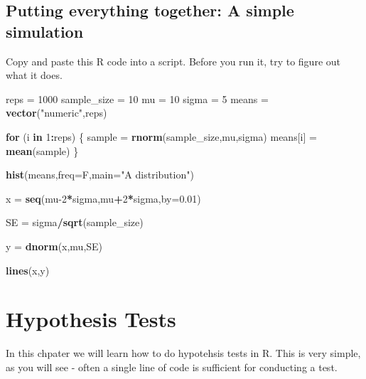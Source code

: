 \documentclass[]{article}
\newenvironment{Shaded}{\begin{snugshade}}{\end{snugshade}}
\newcommand{\ControlFlowTok}[1]{\textcolor[rgb]{0.13,0.29,0.53}{\textbf{#1}}}
\newcommand{\DataTypeTok}[1]{\textcolor[rgb]{0.13,0.29,0.53}{#1}}
\newcommand{\DecValTok}[1]{\textcolor[rgb]{0.00,0.00,0.81}{#1}}
\newcommand{\FloatTok}[1]{\textcolor[rgb]{0.00,0.00,0.81}{#1}}
\newcommand{\KeywordTok}[1]{\textcolor[rgb]{0.13,0.29,0.53}{\textbf{#1}}}
\newcommand{\NormalTok}[1]{#1}
\newcommand{\OperatorTok}[1]{\textcolor[rgb]{0.81,0.36,0.00}{\textbf{#1}}}
\newcommand{\StringTok}[1]{\textcolor[rgb]{0.31,0.60,0.02}{#1}}
\begin{document}
\hypertarget{putting-everything-together-a-simple-simulation}{%
\subsection{Putting everything together: A simple
simulation}\label{putting-everything-together-a-simple-simulation}}

Copy and paste this R code into a script. Before you run it, try to
figure out what it does.

\begin{Shaded}
\begin{Highlighting}[]
\NormalTok{reps =}\StringTok{ }\DecValTok{1000}
\NormalTok{sample_size =}\StringTok{ }\DecValTok{10}
\NormalTok{mu =}\StringTok{ }\DecValTok{10}
\NormalTok{sigma =}\StringTok{ }\DecValTok{5}
\NormalTok{means =}\StringTok{ }\KeywordTok{vector}\NormalTok{(}\StringTok{"numeric"}\NormalTok{,reps)}

\ControlFlowTok{for}\NormalTok{ (i }\ControlFlowTok{in} \DecValTok{1}\OperatorTok{:}\NormalTok{reps)}
\NormalTok{\{}
\NormalTok{  sample =}\StringTok{ }\KeywordTok{rnorm}\NormalTok{(sample_size,mu,sigma)}
\NormalTok{  means[i] =}\StringTok{ }\KeywordTok{mean}\NormalTok{(sample)}
\NormalTok{\}}

\KeywordTok{hist}\NormalTok{(means,}\DataTypeTok{freq=}\NormalTok{F,}\DataTypeTok{main=}\StringTok{"A distribution"}\NormalTok{)}

\NormalTok{x =}\StringTok{ }\KeywordTok{seq}\NormalTok{(mu}\DecValTok{-2}\OperatorTok{*}\NormalTok{sigma,mu}\OperatorTok{+}\DecValTok{2}\OperatorTok{*}\NormalTok{sigma,}\DataTypeTok{by=}\FloatTok{0.01}\NormalTok{)}

\NormalTok{SE =}\StringTok{ }\NormalTok{sigma}\OperatorTok{/}\KeywordTok{sqrt}\NormalTok{(sample_size)}

\NormalTok{y =}\StringTok{ }\KeywordTok{dnorm}\NormalTok{(x,mu,SE)}

\KeywordTok{lines}\NormalTok{(x,y)}
\end{Highlighting}
\end{Shaded}

\hypertarget{hypothesis-tests}{%
\section{Hypothesis Tests}\label{hypothesis-tests}}

In this chpater we will learn how to do hypotehsis tests in R. This is
very simple, as you will see - often a single line of code is sufficient
for conducting a test.
\end{document}
